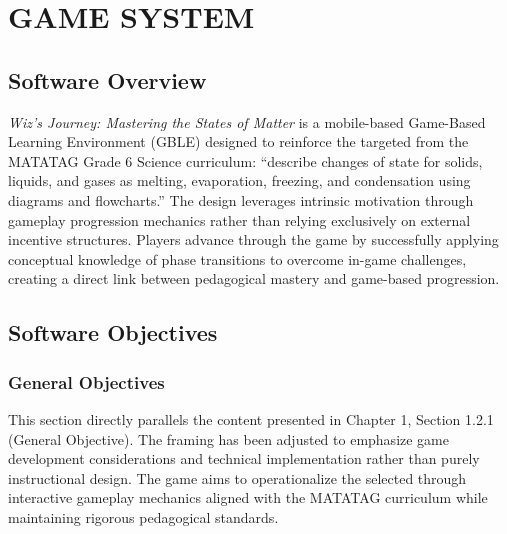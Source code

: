\chapter{GAME SYSTEM}

\section{Software Overview}

\textit{Wiz's Journey: Mastering the States of Matter} is a mobile-based Game-Based Learning Environment (GBLE) designed to reinforce the targeted  from the MATATAG Grade 6 Science curriculum: ``describe changes of state for solids, liquids, and gases as melting, evaporation, freezing, and condensation using diagrams and flowcharts.'' The design leverages intrinsic motivation through gameplay progression mechanics rather than relying exclusively on external incentive structures. Players advance through the game by successfully applying conceptual knowledge of phase transitions to overcome in-game challenges, creating a direct link between pedagogical mastery and game-based progression.

\section{Software Objectives}

\subsection{General Objectives}

This section directly parallels the content presented in Chapter 1, Section 1.2.1 (General Objective). The framing has been adjusted to emphasize game development considerations and technical implementation rather than purely instructional design. The game aims to operationalize the selected  through interactive gameplay mechanics aligned with the MATATAG curriculum while maintaining rigorous pedagogical standards.

